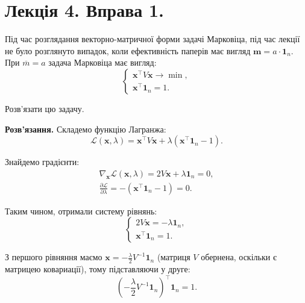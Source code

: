 \documentclass{hw_template}
\begin{document}
\newpage

\section{Лекція 4. Вправа 1.}

\begin{problem}
    Під час розглядання векторно-матричної форми задачі Марковіца, під час 
    лекції не було розглянуто випадок, коли ефективність паперів 
    має вигляд $\mathbf{m} = a \cdot \mathbf{1}_n$. При $\overline{m}=a$ задача 
    Марковіца має вигляд:
    \begin{equation*}
        \begin{cases}
            \mathbf{x}^{\top}V\mathbf{x} \to \min, \\
            \mathbf{x}^{\top}\mathbf{1}_n = 1.
        \end{cases}
    \end{equation*}

    Розв'язати цю задачу.
\end{problem}

\textbf{Розв'язання.} Складемо функцію Лагранжа:
\begin{equation*}
    \mathcal{L}(\mathbf{x},\lambda) = \mathbf{x}^{\top}V\mathbf{x} + \lambda(\mathbf{x}^{\top}\mathbf{1}_n - 1).
\end{equation*}

Знайдемо градієнти:
\begin{align*}
    \nabla_{\mathbf{x}}\mathcal{L}(\mathbf{x},\lambda) = 2V\mathbf{x} + \lambda\mathbf{1}_n = 0, \\
    \frac{\partial \mathcal{L}}{\partial \lambda} = -(\mathbf{x}^{\top}\mathbf{1}_n-1) = 0.
\end{align*}

Таким чином, отримали систему рівнянь:
\begin{equation*}
    \begin{cases}
        2V\mathbf{x} = -\lambda\mathbf{1}_n, \\
        \mathbf{x}^{\top}\mathbf{1}_n = 1.
    \end{cases}
\end{equation*}

З першого рівняння маємо $\mathbf{x} = -\frac{\lambda}{2}V^{-1}\mathbf{1}_n$ (матриця $V$ обернена, 
оскільки є матрицею ковариації), тому підставляючи у друге:
\begin{equation*}
    \left(-\frac{\lambda}{2}V^{-1}\mathbf{1}_n\right)^{\top}\mathbf{1}_n = 1.
\end{equation*} 
\end{document}
